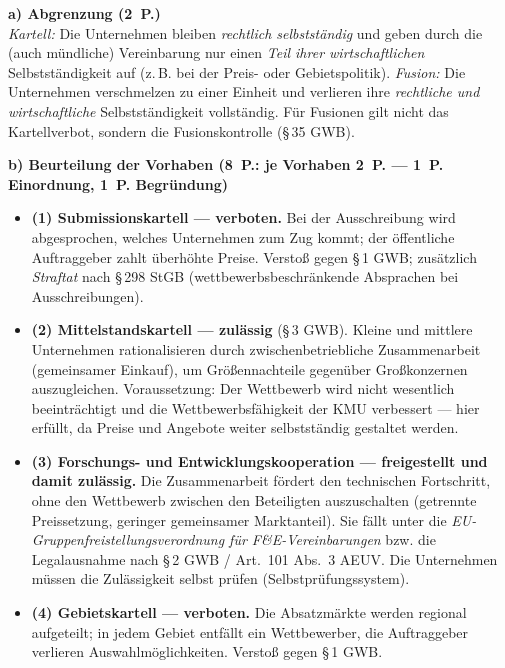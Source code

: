 \begin{loesung}[title={Lösung Aufgabe~2.2 --- Kartellverbot und Ausnahmen}]
\textbf{a) Abgrenzung (2~P.)}\\
\emph{Kartell:} Die Unternehmen bleiben \emph{rechtlich selbstständig} und geben durch
die (auch mündliche) Vereinbarung nur einen \emph{Teil ihrer wirtschaftlichen}
Selbstständigkeit auf (z.\,B. bei der Preis- oder Gebietspolitik).
\emph{Fusion:} Die Unternehmen verschmelzen zu einer Einheit und verlieren ihre
\emph{rechtliche und wirtschaftliche} Selbstständigkeit vollständig. Für Fusionen gilt
nicht das Kartellverbot, sondern die Fusionskontrolle (\S\,35 GWB).

\textbf{b) Beurteilung der Vorhaben (8~P.: je Vorhaben 2~P. --- 1~P. Einordnung, 1~P. Begründung)}
\begin{itemize}
  \item \textbf{(1) Submissionskartell --- verboten.} Bei der Ausschreibung wird
    abgesprochen, welches Unternehmen zum Zug kommt; der öffentliche Auftraggeber zahlt
    überhöhte Preise. Verstoß gegen \S\,1 GWB; zusätzlich \emph{Straftat} nach \S\,298
    StGB (wettbewerbsbeschränkende Absprachen bei Ausschreibungen).
  \item \textbf{(2) Mittelstandskartell --- zulässig} (\S\,3 GWB). Kleine und mittlere
    Unternehmen rationalisieren durch zwischenbetriebliche Zusammenarbeit (gemeinsamer
    Einkauf), um Größennachteile gegenüber Großkonzernen auszugleichen. Voraussetzung:
    Der Wettbewerb wird nicht wesentlich beeinträchtigt und die Wettbewerbsfähigkeit der
    KMU verbessert --- hier erfüllt, da Preise und Angebote weiter selbstständig gestaltet
    werden.
  \item \textbf{(3) Forschungs- und Entwicklungskooperation --- freigestellt und damit
    zulässig.} Die Zusammenarbeit fördert den technischen Fortschritt, ohne den
    Wettbewerb zwischen den Beteiligten auszuschalten (getrennte Preissetzung, geringer
    gemeinsamer Marktanteil). Sie fällt unter die \emph{EU-Gruppenfreistellungsverordnung
    für F\&E-Vereinbarungen} bzw. die Legalausnahme nach \S\,2 GWB / Art.~101 Abs.~3 AEUV.
    Die Unternehmen müssen die Zulässigkeit selbst prüfen (Selbstprüfungssystem).
  \item \textbf{(4) Gebietskartell --- verboten.} Die Absatzmärkte werden regional
    aufgeteilt; in jedem Gebiet entfällt ein Wettbewerber, die Auftraggeber verlieren
    Auswahlmöglichkeiten. Verstoß gegen \S\,1 GWB.
\end{itemize}
\end{loesung}

